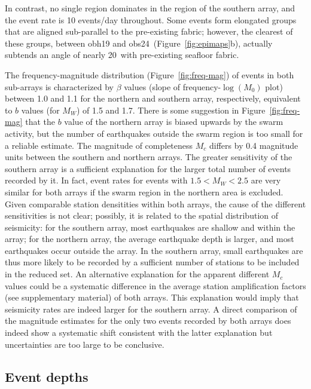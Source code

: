 \documentclass[reviewcopy]{elsart}
\begin{document}
In contrast, no single region dominates in the region of the southern
array, and the event rate is 10 
events/day throughout.  Some events form elongated groups that are
aligned sub-parallel to the pre-existing fabric; however, the clearest
of these groups,
between obh19 and obs24~(Figure~\ref{fig:epimaps}b), actually subtends an angle
of nearly 20\dg\ with pre-existing seafloor fabric.  

The frequency-magnitude distribution (Figure~\ref{fig:freq-mag}) of
events in both sub-arrays is
characterized by $\beta$ values (slope of frequency-$\log(M_0)$ plot) between 1.0 and 1.1 for the
northern and southern array, respectively,
equivalent to $b$ values (for $M_W$) of
1.5 and 1.7.
There is
some suggestion in Figure~\ref{fig:freq-mag} that the $b$ value of the northern array is biased upwards by
the swarm activity, but the number of earthquakes outside the swarm
region is too small for a reliable estimate. 
The magnitude of completeness $M_c$ differs by 0.4 magnitude units between
the southern and northern arrays.
The greater sensitivity of the southern array 
 is a sufficient  explanation for the larger total number of events
recorded by it.
  In fact, event rates for events with $1.5<M_W<2.5$
are very similar for both arrays if the swarm region in the northern area is
excluded.   Given comparable station densitities within both arrays,
the cause of the different sensitivities is not clear; possibly, it
is related to the spatial distribution of seismicity: for the
southern array, most earthquakes are shallow and within the array;
for the northern array, the average earthquake depth is larger, and
most earthquakes occur outside the array. In the southern array, small
earthquakes are thus more likely to be recorded by a sufficient number
of stations to be included in the reduced set. 
An alternative explanation for the apparent different $M_c$ values 
could be a systematic difference in the average station
amplification factors (see supplementary material) of both
arrays. This explanation would imply that seismicity rates are indeed
larger for the southern array.  A direct comparison of the magnitude
estimates for the only two events recorded by both arrays does indeed show
a systematic shift consistent with the latter explanation but
uncertainties are too large to be conclusive. 

\subsection{Event depths}
\end{document}
